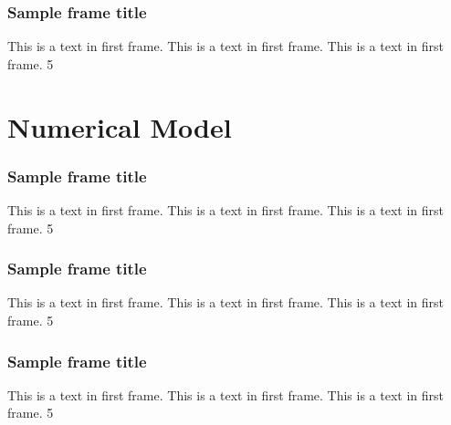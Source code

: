 \documentclass{beamer}
\begin{document}

\begin{frame}
\frametitle{Sample frame title}
This is a text in first frame. This is a text in first frame. This is a text in first frame.
\SI{5}{\nT}
\end{frame}


\section{Numerical Model}


\begin{frame}
\frametitle{Sample frame title}
This is a text in first frame. This is a text in first frame. This is a text in first frame.
\SI{5}{\nT}
\end{frame}


\begin{frame}
\frametitle{Sample frame title}
This is a text in first frame. This is a text in first frame. This is a text in first frame.
\SI{5}{\nT}
\end{frame}


\begin{frame}
\frametitle{Sample frame title}
This is a text in first frame. This is a text in first frame. This is a text in first frame.
\SI{5}{\nT}
\end{frame}
\end{document}
